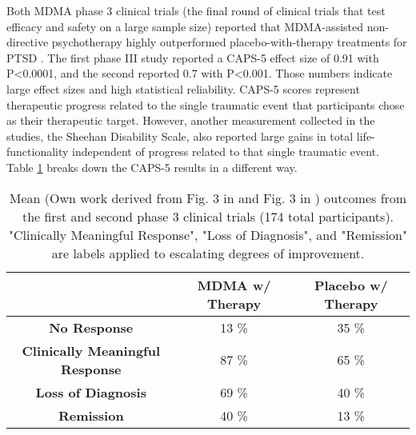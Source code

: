 \documentclass[12pt,letterpaper]{book}
\begin{document}
Both MDMA phase 3 clinical trials (the final round of clinical trials that test efficacy and safety on a large sample size) reported that MDMA-assisted non-directive psychotherapy highly outperformed placebo-with-therapy treatments for PTSD \cite{mitchellMDMAClinicalTrial,mitchellMDMAClinicalTrial2}. The first phase III study reported a CAPS-5 effect size of 0.91 with P<0.0001, and the second reported 0.7 with P<0.001. Those numbers indicate large effect sizes and high statistical reliability. CAPS-5 scores represent therapeutic progress related to the single traumatic event that participants chose as their therapeutic target. However, another measurement collected in the studies, the Sheehan Disability Scale, also reported large gains in total life-functionality independent of progress related to that single traumatic event. Table \ref{table:efficacy} breaks down the CAPS-5 results in a different way.
\FloatBarrier
\begin{table}
    \centering
    \caption{Mean (Own work derived from Fig. 3 in \textcite{mitchellMDMAClinicalTrial} and Fig. 3 in \textcite{mitchellMDMAClinicalTrial2}) outcomes from the first and second phase 3 clinical trials (174 total participants). "Clinically Meaningful Response", "Loss of Diagnosis", and "Remission" are labels applied to escalating degrees of improvement.}
    \label{table:efficacy}
    \begin{tabular}{|c|c|c|}
    \hline
     & \textbf{MDMA w/ Therapy} & \textbf{Placebo w/ Therapy} \\ \hline
    \textbf{No Response}          & 13 \%          & 35 \%          \\ \hline
    \textbf{Clinically Meaningful Response}          & 87 \%          & 65 \%         \\ \hline
    \textbf{Loss of Diagnosis} & 69 \% & 40 \% \\ \hline
    \textbf{Remission}          & 40 \%          & 13 \%          \\ \hline
    \end{tabular}
\end{table}
\FloatBarrier
\end{document}
